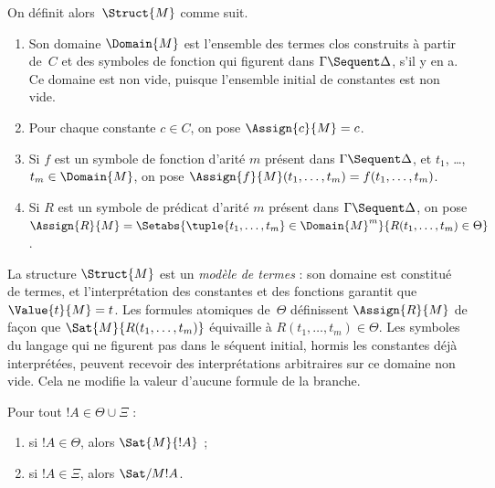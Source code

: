 \documentclass[../../../include/open-logic-section]{subfiles}
\begin{document}
On définit alors~$\Struct{M}$ comme suit.
\begin{enumerate}
  \item Son domaine $\Domain{M}$ est l'ensemble
  des termes clos construits à partir de~$C$
  et des symboles de fonction qui figurent dans
  $\Gamma \Sequent \Delta$, s'il y en a.
  Ce domaine est non vide, puisque l'ensemble
  initial de constantes est non vide.

  \item Pour chaque constante $c \in C$,
  on pose $\Assign{c}{M} = c$.

  \item Si $f$ est un symbole de fonction d'arité $m$
  présent dans $\Gamma \Sequent \Delta$, et
  $t_1$, \dots, $t_m \in \Domain{M}$, on pose
  $\Assign{f}{M}(t_1, \dots, t_m) =
  f(t_1, \dots, t_m)$.

  \item Si $R$ est un symbole de prédicat d'arité $m$
  présent dans $\Gamma \Sequent \Delta$, on pose
  $\Assign{R}{M} = \Setabs{\tuple{t_1, \dots, t_m} \in
  \Domain{M}^m}{R(t_1, \dots, t_m) \in \Theta}$.
\end{enumerate}

La structure $\Struct{M}$ est un \emph{modèle de termes} :
son domaine est constitué de termes, et l'interprétation
des constantes et des fonctions garantit que
$\Value{t}{M} = t$. Les formules atomiques de~$\Theta$
définissent $\Assign{R}{M}$ de façon que
$\Sat{M}{R(t_1, \dots, t_m)}$ équivaille à
$R(t_1, \dots, t_m) \in \Theta$.
Les symboles du langage qui ne figurent pas dans
le séquent initial, hormis les constantes déjà
interprétées, peuvent recevoir des interprétations
arbitraires sur ce domaine non vide. Cela ne
modifie la valeur d'aucune formule de la branche.

\begin{lem}
Pour tout $!A \in \Theta \cup \Xi$ :
\begin{enumerate}
  \item si $!A \in \Theta$, alors $\Sat{M}{!A}$ ;
  \item si $!A \in \Xi$, alors $\Sat/{M}{!A}$.
\end{enumerate}
\end{lem}
\end{document}
